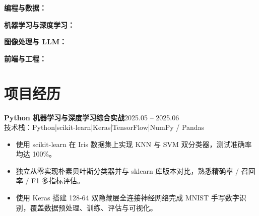 \documentclass[10pt,a4paper]{article}
\newcommand{\projectblock}[3]{%
    {\bfseries\color{darktext}#1}\hfill{\color{graytext}#2}\\%
    {\small\color{graytext}#3}%
    \vspace{0.2em}%
}
\begin{document}
{\bfseries\color{primary}编程与数据：}

\vspace{2pt}

{\bfseries\color{primary}机器学习与深度学习：}

\vspace{2pt}

{\bfseries\color{primary}图像处理与 LLM：}

\vspace{2pt}

{\bfseries\color{primary}前端与工程：}

\section{\faProjectDiagram\hspace{0.4em}项目经历}

\projectblock{Python 机器学习与深度学习综合实战}{2025.05 -- 2025.06}{技术栈：Python\hspace{0.3em}|\hspace{0.3em}scikit-learn\hspace{0.3em}|\hspace{0.3em}Keras\hspace{0.3em}|\hspace{0.3em}TensorFlow\hspace{0.3em}|\hspace{0.3em}NumPy / Pandas}

\begin{itemize}[leftmargin=1.5em, itemsep=2pt, parsep=0pt, topsep=2pt]
    \item 使用 scikit-learn 在 Iris 数据集上实现 KNN 与 SVM 双分类器，测试准确率均达 100\%。
    \item 独立从零实现朴素贝叶斯分类器并与 sklearn 库版本对比，熟悉精确率 / 召回率 / F1 多指标评估。
    \item 使用 Keras 搭建 128-64 双隐藏层全连接神经网络完成 MNIST 手写数字识别，覆盖数据预处理、训练、评估与可视化。
\end{itemize}
\end{document}
